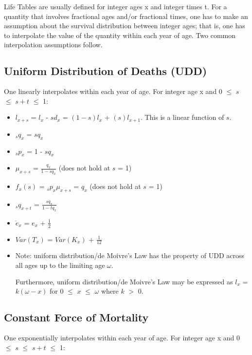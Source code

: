 \documentclass[]{book}
\begin{document}
Life Tables are usually defined for integer ages x and integer times t.
For a quantity that involves fractional ages and/or fractional times,
one has to make an assumption about the survival distribution between
integer ages; that is, one has to interpolate the value of the quantity
within each year of age. Two common interpolation assumptions follow.

\subsection{Uniform Distribution of Deaths
(UDD)}\label{uniform-distribution-of-deaths-udd}

One linearly interpolates within each year of age. For integer age x and
0 \(\le\) \(s\) \(\le\) \(s + t\) \(\le\) 1:

\begin{itemize}
\item
  \(l_{x + s}\) = \(l_x\) - \(s\)\(d_x\) = \((1 - s)l_x\) +
  \((s)l_{x + 1}\). This is a linear function of \(s\).
\item
  \({}_{s}q_x\) = \(s\)\(q_x\)
\item
  \({}_{s}p_x\) = 1 - \(s\)\(q_x\)
\item
  \(\mu_{x + s}\) = \(\frac{q_x}{1 - sq_x}\) (does not hold at \(s\) =
  1)
\item
  \(f_x(s)\) = \({}_{s}p_x\)\(\mu_{x + s}\) = \(q_x\) (does not hold at
  \(s\) = 1)
\item
  \({}_{s}q_{x + t}\) = \(\frac{sq_x}{1 - tq_x}\)
\item
  \(\mathring{e}_x\) = \(e_x\) + \(\frac{1}{2}\)
\item
  \(Var(T_x)\) = \(Var(K_x)\) + \(\frac{1}{12}\)
\item
  Note: uniform distribution/de Moivre's Law has the property of UDD
  across all ages up to the limiting age \(\omega\).

  Furthermore, uniform distribution/de Moivre's Law may be expressed as
  \(l_x\) = \(k(\omega - x)\) for 0 \(\le\) \(x\) \(\le\) \(\omega\)
  where \(k\) \(>\) 0.
\end{itemize}

\subsection{Constant Force of
Mortality}\label{constant-force-of-mortality-1}

One exponentially interpolates within each year of age. For integer age
x and 0 \(\le\) \(s\) \(\le\) \(s + t\) \(\le\) 1:
\end{document}
